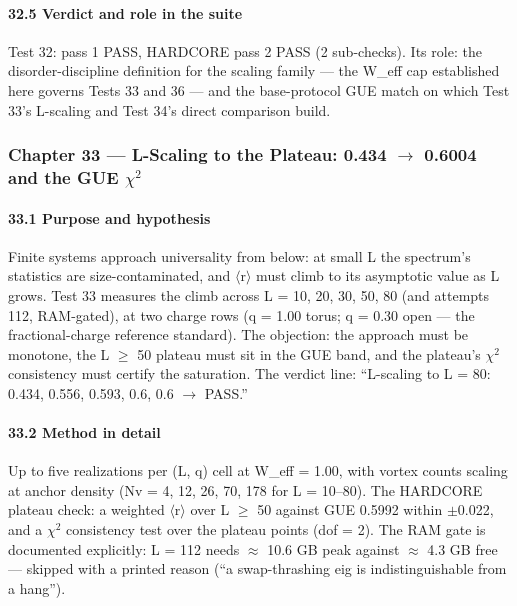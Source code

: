 \documentclass[10pt]{article}
\begin{document}
\paragraph{32.5 Verdict and role in the suite}

Test 32: pass 1 PASS, HARDCORE pass 2 PASS (2 sub-checks). Its role: the disorder-discipline definition for the scaling family --- the W\_eff cap established here governs Tests 33 and 36 --- and the base-protocol GUE match on which Test 33's L-scaling and Test 34's direct comparison build.

\subsubsection{Chapter 33 --- L-Scaling to the Plateau: 0.434 $\rightarrow$ 0.6004 and the GUE $\chi$$^2$}

\paragraph{33.1 Purpose and hypothesis}

Finite systems approach universality from below: at small L the spectrum's statistics are size-contaminated, and $\langle$r$\rangle$ must climb to its asymptotic value as L grows. Test 33 measures the climb across L = 10, 20, 30, 50, 80 (and attempts 112, RAM-gated), at two charge rows (q = 1.00 torus; q = 0.30 open --- the fractional-charge reference standard). The objection: the approach must be monotone, the L $\ge$ 50 plateau must sit in the GUE band, and the plateau's $\chi$$^2$ consistency must certify the saturation. The verdict line: ``L-scaling to L = 80: 0.434, 0.556, 0.593, 0.6, 0.6 $\rightarrow$ PASS.''

\paragraph{33.2 Method in detail}

Up to five realizations per (L, q) cell at W\_eff = 1.00, with vortex counts scaling at anchor density (Nv = 4, 12, 26, 70, 178 for L = 10--80). The HARDCORE plateau check: a weighted $\langle$r$\rangle$ over L $\ge$ 50 against GUE 0.5992 within $\pm$0.022, and a $\chi$$^2$ consistency test over the plateau points (dof = 2). The RAM gate is documented explicitly: L = 112 needs $\approx$ 10.6 GB peak against $\approx$ 4.3 GB free --- skipped with a printed reason (``a swap-thrashing eig is indistinguishable from a hang'').
\end{document}
